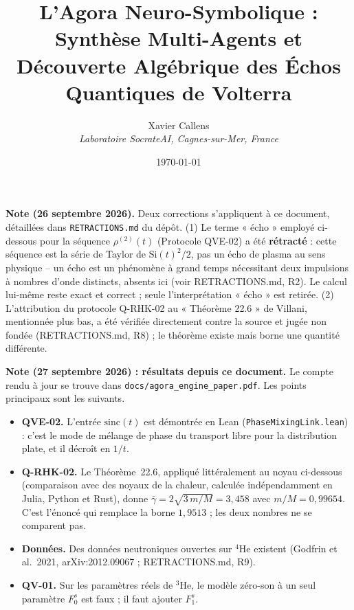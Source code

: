 \documentclass[11pt, a4paper]{article}
\title{\textbf{L'Agora Neuro-Symbolique :\\ Synthèse Multi-Agents et Découverte Algébrique des Échos Quantiques de Volterra}}
\author{Xavier Callens \\ \textit{Laboratoire SocrateAI, Cagnes-sur-Mer, France}}
\date{\today}
\newenvironment{mdframed}[1][]{%
  \medskip
  \noindent
  \begin{lrbox}{\mybox}%
  \begin{minipage}{\dimexpr\linewidth-2\fboxsep-2\fboxrule\relax}%
}{%
  \end{minipage}%
  \end{lrbox}%
  \fcolorbox{black}{gray!5}{\usebox{\mybox}}%
  \medskip
}
\begin{document}
\maketitle

\begin{mdframed}[backgroundcolor=gray!5, linecolor=black, linewidth=1pt]
\noindent\textbf{Note (26 septembre 2026).} Deux corrections s'appliquent à ce document, détaillées
dans \texttt{RETRACTIONS.md} du dépôt. (1) Le terme « écho » employé ci-dessous pour la séquence
$\rho^{(2)}(t)$ (Protocole QVE-02) a été \textbf{rétracté} : cette séquence est la série de Taylor de
$\mathrm{Si}(t)^2/2$, pas un écho de plasma au sens physique -- un écho est un phénomène à grand temps
nécessitant deux impulsions à nombres d'onde distincts, absents ici (voir RETRACTIONS.md, R2). Le
calcul lui-même reste exact et correct ; seule l'interprétation « écho » est retirée. (2) L'attribution
du protocole Q-RHK-02 au « Théorème 22.6 » de Villani, mentionnée plus bas, a été vérifiée directement
contre la source et jugée non fondée (RETRACTIONS.md, R8) ; le théorème existe mais borne une quantité
différente.

\smallskip
\noindent\textbf{Note (27 septembre 2026) : résultats depuis ce document.} Le compte rendu à jour se
trouve dans \texttt{docs/agora\_engine\_paper.pdf}. Les points principaux sont les suivants.
\begin{itemize}
\item \textbf{QVE-02.} L'entrée $\mathrm{sinc}(t)$ est démontrée en Lean
(\texttt{PhaseMixingLink.lean}) : c'est le mode de mélange de phase du transport libre pour la
distribution plate, et il décroît en $1/t$.
\item \textbf{Q-RHK-02.} Le Théorème~22.6, appliqué littéralement au noyau ci-dessous
(comparaison avec des noyaux de la chaleur, calculée indépendamment en Julia, Python et Rust), donne
$\bar\gamma = 2\sqrt{3\,m/M} = 3{,}458$ avec $m/M = 0{,}99654$. C'est l'énoncé qui remplace la
borne $1{,}9513$ ; les deux nombres ne se comparent pas.
\item \textbf{Données.} Des données neutroniques ouvertes sur $^4$He existent (Godfrin et al.\ 2021,
arXiv:2012.09067 ; RETRACTIONS.md, R9).
\item \textbf{QV-01.} Sur les paramètres réels de $^3$He, le modèle zéro-son à un seul paramètre
$F_0^s$ est faux ; il faut ajouter $F_1^s$.
\end{itemize}
\end{mdframed}
\end{document}
